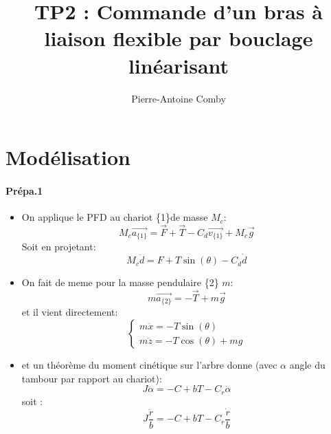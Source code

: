 \documentclass[10pt,a4paper,notitlepage]{article}
\author{Pierre-Antoine Comby}
\title{TP2 : Commande d'un bras à liaison flexible par bouclage linéarisant}
\renewcommand{\vec}{\overrightarrow}
\begin{document}
\maketitle
\section{Modélisation}
\paragraph{Prépa.1}
\begin{itemize}
\item On applique le PFD au chariot \{1\}de masse $M_c$:
\begin{equation}
  M_c\vec{a_{\{1\}}} = \vec{F}+\vec{T}-C_d\vec{v_{\{1\}}}+M_c\vec{g}
\end{equation}
Soit en projetant:
\begin{equation}
  M_c \ddot{d} = F+T\sin(\theta)-C_d\dot{d}
\end{equation}
\item On fait de meme pour la masse pendulaire \{2\} $m$:
\begin{equation}
  m \vec{a_{\{2\}}} = -\vec{T} +m \vec{g}
\end{equation}
et il vient directement:
\begin{equation}
  \begin{cases}
    m\ddot{x} = -T\sin(\theta)\\
    m\ddot{z} = -T\cos(\theta)+mg
  \end{cases}
\end{equation}
\item et un théorème du moment cinétique sur l'arbre donne (avec $\alpha$ angle du tambour par rapport au chariot):
  \begin{equation}
    J\ddot{\alpha} = -C +bT-C_r \dot{\alpha}
  \end{equation}
  soit :
  \begin{equation}
    J \frac{\ddot{r}}{b} = -C+bT -C_r \frac{\dot{r}}{b}
  \end{equation}
\end{itemize}
\end{document}
